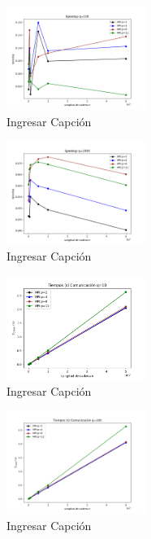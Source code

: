 \begin{figure}[H]
    \centerline{
        \includegraphics[width=0.4\textwidth]{graficos/speedup_q100.png}
    }
    \caption{Ingresar Capción}
    \label{grafico:speedup_q100}
\end{figure}
\begin{figure}[H]
    \centerline{
        \includegraphics[width=0.4\textwidth]{graficos/speedup_q1000.png}
    }
    \caption{Ingresar Capción}
    \label{grafico:speedup_q1000}
\end{figure}
\begin{figure}[H]
    \centerline{
        \includegraphics[width=0.4\textwidth]{graficos/tiempos_comunicacion_q10.png}
    }
    \caption{Ingresar Capción}
    \label{grafico:tiempos_comunicacion_q10}
\end{figure}
\begin{figure}[H]
    \centerline{
        \includegraphics[width=0.4\textwidth]{graficos/tiempos_comunicacion_q100.png}
    }
    \caption{Ingresar Capción}
    \label{grafico:tiempos_comunicacion_q100}
\end{figure}
